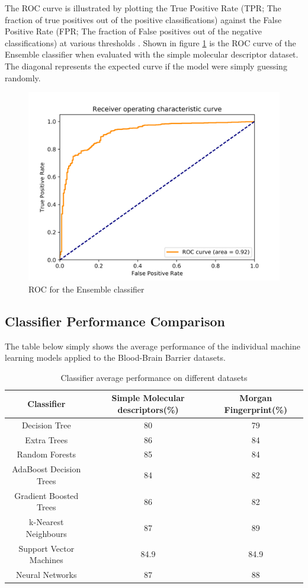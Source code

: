 \documentclass[a4paper,12pt]{report}
\begin{document}
			The ROC curve is illustrated by plotting the True Positive Rate (TPR; The fraction of true positives out of the positive classifications) against the False Positive Rate (FPR; The fraction of False positives out of the negative classifications) at various thresholds \cite{TFawcett2005}. Shown in figure \ref{fig:roc} is the ROC curve of the Ensemble classifier when evaluated with the simple molecular descriptor dataset. The diagonal represents the expected curve if the model were simply guessing randomly.
				\begin{figure}[H]
					\centering
					\includegraphics[width=\textwidth,scale=1]{images/roc_curve}
					\caption{ROC for the Ensemble classifier}
					\label{fig:roc}
				\end{figure}
		
		\subsection{Classifier Performance Comparison}
		The table below simply shows the average performance of the individual machine learning models applied to the Blood-Brain Barrier datasets.
		\begin{table}[ht]
			\caption{Classifier average performance on different datasets}
			\centering
			\begin{tabular}{c|c|c}	
				\hline\hline
				Classifier & Simple Molecular descriptors(\%) & Morgan Fingerprint(\%) \\
				\hline
				Decision Tree & 80 & 79 \\
				Extra Trees & 86 & 84 \\
				Random Forests & 85 & 84 \\
				AdaBoost Decision Trees & 84 & 82 \\
				Gradient Boosted Trees & 86 & 82 \\
				k-Nearest Neighbours & 87 & 89 \\ 
				Support Vector Machines & 84.9 & 84.9 \\
				Neural Networks & 87 & 88 \\
				\hline
			\end{tabular}
		\end{table}
\end{document}
